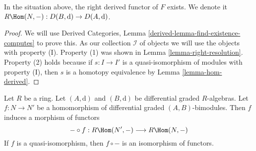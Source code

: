 \begin{lemma}
\label{lemma-derived-restriction}
In the situation above, the right derived functor of $F$ exists.
We denote it $R\Hom(N, -) : D(B, \text{d}) \to D(A, \text{d})$.
\end{lemma}

\begin{proof}
We will use
Derived Categories, Lemma \ref{derived-lemma-find-existence-computes}
to prove this. As our collection $\mathcal{I}$
of objects we will use the objects with property (I).
Property (1) was shown in Lemma \ref{lemma-right-resolution}.
Property (2) holds because if $s : I \to I'$ is a quasi-isomorphism
of modules with property (I), then $s$ is a homotopy equivalence
by Lemma \ref{lemma-hom-derived}.
\end{proof}

\begin{lemma}
\label{lemma-functoriality-derived-restriction}
Let $R$ be a ring. Let $(A, \text{d})$ and $(B, \text{d})$ be
differential graded $R$-algebras. Let $f : N \to N'$ be a
homomorphism of differential graded $(A, B)$-bimodules.
Then $f$ induces a morphism of functors
$$
- \circ f : R\Hom(N', -) \longrightarrow R\Hom(N, -)
$$
If $f$ is a quasi-isomorphism, then $f \circ -$ is an isomorphism of
functors.
\end{lemma}


